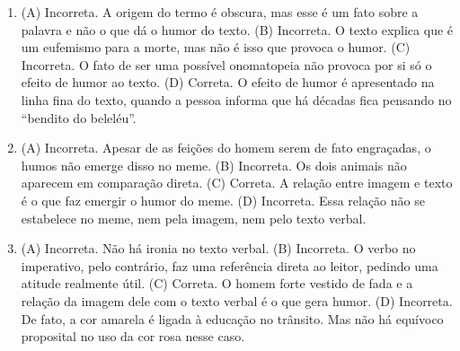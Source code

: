 \begin{enumerate}
\item (A) Incorreta. A origem do termo é obscura, mas esse é um fato sobre a
palavra e não o que dá o humor do texto.
(B) Incorreta. O texto explica que é um eufemismo para a morte, mas não é
isso que provoca o humor.
(C) Incorreta. O fato de ser uma possível onomatopeia não provoca por si
só o efeito de humor ao texto.
(D) Correta. O efeito de humor é apresentado na linha fina do texto,
quando a pessoa informa que há décadas fica pensando no ``bendito do
beleléu''.

\item (A) Incorreta. Apesar de as feições do homem serem de fato engraçadas, o
humos não emerge disso no meme.
(B) Incorreta. Os dois animais não aparecem em comparação direta.
(C) Correta. A relação entre imagem e texto é o que faz emergir o humor
do meme.
(D) Incorreta. Essa relação não se estabelece no meme, nem pela imagem,
nem pelo texto verbal.

\item (A) Incorreta. Não há ironia no texto verbal.
(B) Incorreta. O verbo no imperativo, pelo contrário, faz uma referência
direta ao leitor, pedindo uma atitude realmente útil.
(C) Correta. O homem forte vestido de fada e a relação da imagem dele com
o texto verbal é o que gera humor.
(D) Incorreta. De fato, a cor amarela é ligada à educação no trânsito.
Mas não há equívoco proposital no uso da cor rosa nesse caso.
\end{enumerate}


